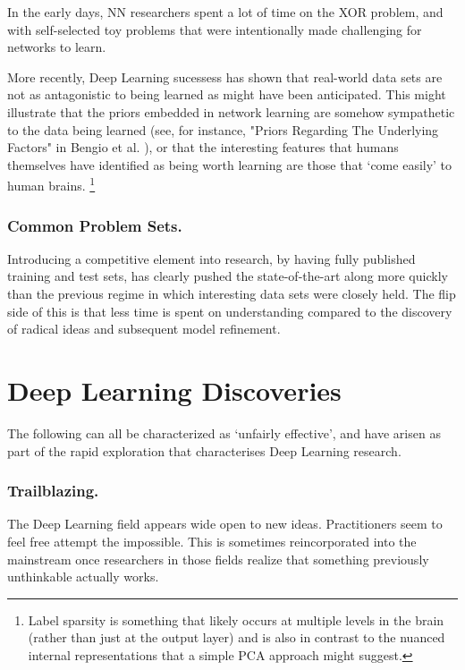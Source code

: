 \documentclass[citeauthoryear]{llncs}
\begin{document}
In the early days, NN researchers spent a lot of time on the 
XOR problem, and with self-selected toy problems that were 
intentionally made challenging for networks to learn.

More recently, Deep Learning sucessess has shown that real-world data sets 
are not as antagonistic to being learned as might have been anticipated.  
This might illustrate that the priors embedded in network learning are 
somehow sympathetic to the data being learned 
(see, for instance, "Priors Regarding The Underlying Factors" in Bengio et al. \cite{Bengio-et-al-2014-Book}),
or that the interesting features that humans themselves have identified as being 
worth learning are those that `come easily' to human brains.
\footnote{
Label sparsity is something that likely occurs at multiple levels in the brain 
(rather than just at the output layer) and is also in contrast to the 
nuanced internal representations that a simple PCA approach might suggest.
}

\subsubsection*{Common Problem Sets.}

Introducing a competitive element into research, by having fully published
training and test sets, has clearly pushed the state-of-the-art along more 
quickly than the previous regime in which interesting data sets were closely held.
The flip side of this is that less time is spent on understanding 
compared to the discovery of radical ideas and subsequent model refinement.


\section{Deep Learning Discoveries}

The following can all be characterized as `unfairly effective', and have 
arisen as part of the rapid exploration that characterises Deep Learning research.

\subsubsection*{Trailblazing.}
The Deep Learning field appears wide open to new ideas.  
Practitioners seem to feel free attempt the impossible.  
This is sometimes reincorporated into the mainstream once researchers in those 
fields realize that something previously unthinkable actually works.
\end{document}
